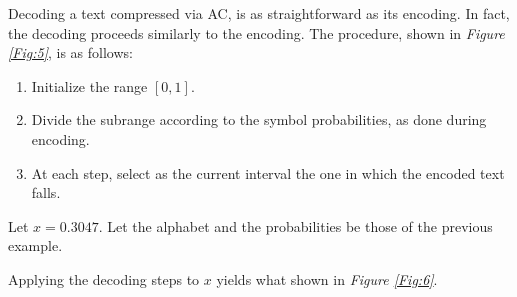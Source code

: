\documentclass{subfiles}
\begin{document}
    Decoding a text compressed via AC, is as straightforward as its encoding.
        In fact, the decoding proceeds similarly to the encoding.
        The procedure, shown in \emph{Figure \ref{Fig:5}}, is as follows:
        \begin{enumerate}
            \item Initialize the range \([0, 1]\).

            \item Divide the subrange according to the symbol probabilities,
                as done during encoding.

            \item At each step, select as the current interval the one in which the 
                encoded text falls.
        \end{enumerate}
        

        \begin{example*}
            Let \(x = 0.3047\). Let the alphabet and the probabilities be those of the previous example.
            

            \noindent Applying the decoding steps to \(x\) yields what shown in \emph{Figure \ref{Fig:6}}.
        \end{example*}
\end{document}

